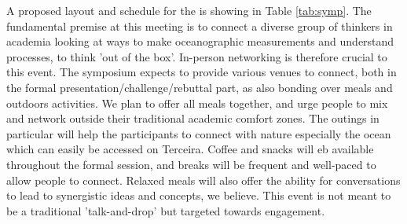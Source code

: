 A proposed layout and schedule for the \symp is showing in Table
\ref{tab:symp}. The fundamental premise at this meeting is to connect a
diverse group of thinkers in academia looking at ways to make
oceanographic measurements and understand processes, to think 'out of
the box'. In-person networking is therefore crucial to this event. The
symposium expects to provide various venues to connect, both in the
formal presentation/challenge/rebuttal part, as also bonding over meals
and outdoors activities. We plan to offer all meals together, and urge
people to mix and network outside their traditional academic comfort
zones. The outings in particular will help the participants to connect
with nature especially the ocean which can easily be accessed on
Terceira. Coffee and snacks will eb available throughout the formal
session, and breaks will be frequent and well-paced to allow people to
connect. Relaxed meals will also offer the ability for conversations to
lead to synergistic ideas and concepts, we believe. This event is not
meant to be a traditional 'talk-and-drop' but targeted towards
engagement. 
